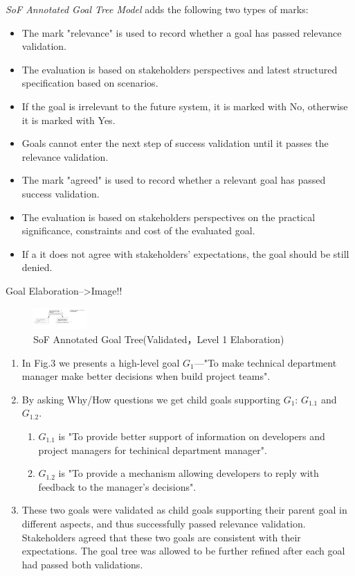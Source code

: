 \documentclass{beamer}
\begin{document}
\begin{frame}{\emph{SoF Annotated Goal Tree Model} adds the following two types of marks:}            
  \begin{itemize}
  \item
    The mark "relevance" is used to record whether a goal has passed relevance validation.
  \item 
    The evaluation is based on stakeholders perspectives and latest structured specification based on scenarios.
  \item 
    If the goal is irrelevant to the future system, it is marked with No, otherwise it is marked with Yes.
  \item 
    Goals cannot enter the next step of success validation until it passes the relevance validation.
  \item
    The mark "agreed" is used to record whether a relevant goal has passed success validation.
  \item 
    The evaluation is based on stakeholders perspectives on the practical significance, constraints and cost of the evaluated goal.
  \item 
    If a it does not agree with stakeholders' expectations, the goal should be still denied.
  \end{itemize}
\end{frame}


\begin{frame}  {Goal Elaboration-->Image!!}
  \begin{figure}
    \includegraphics[width=0.8in]{img/4.PNG}
    \caption{SoF Annotated Goal Tree(Validated，Level 1 Elaboration)}
  \end{figure}
  \tiny{
  \begin{enumerate}
  \item  In Fig.3 we presents a high-level goal $G_1$—"To make technical department manager make better decisions when build project teams".
  \item  By asking Why/How questions we get child goals supporting $G_1$: $G_{1.1}$ and $G_{1.2}$.
    \begin{enumerate}
    \item  $G_{1.1}$ is "To provide better support of information on developers and project managers for techinical department manager".
    \item  $G_{1.2}$ is "To provide a mechanism allowing developers to reply with feedback to the manager's decisions".
    \end{enumerate}
  \item  These two goals were validated as child goals supporting their parent goal in different aspects, and thus successfully passed relevance validation. Stakeholders agreed that these two goals are consistent with their expectations. The goal tree was allowed to be further refined after each goal had passed both validations.
  \end{enumerate}
  }
\end{frame}
\end{document}
